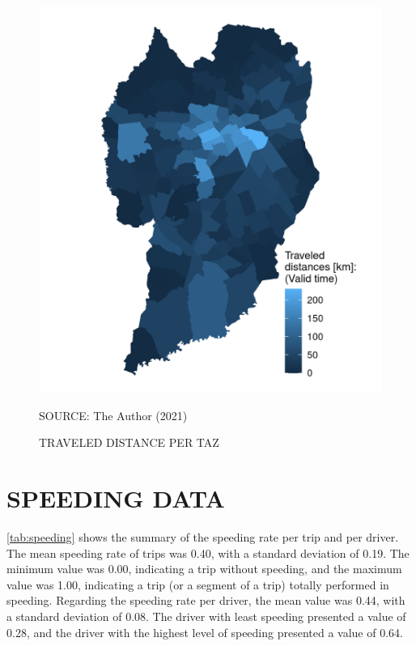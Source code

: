 \begin{figure}[!htbp]
    \centering\footnotesize
    \captionsetup{font=footnotesize}
    \caption{TRAVELED DISTANCE PER TAZ}
    \includegraphics{fig/map_dist.png}
    \label{fig:taz_travel}
    \par SOURCE: The Author (2021)
\end{figure}

\section{SPEEDING DATA} \label{sec:spr}


\autoref{tab:speeding} shows the summary of the speeding rate per trip and per driver. The mean speeding rate of trips was 0.40, with a standard deviation of 0.19. The minimum value was 0.00, indicating a trip without speeding, and the maximum value was 1.00, indicating a trip (or a segment of a trip) totally performed in speeding. Regarding the speeding rate per driver, the mean value was 0.44, with a standard deviation of 0.08. The driver with least speeding presented a value of 0.28, and the driver with the highest level of speeding presented a value of 0.64.

